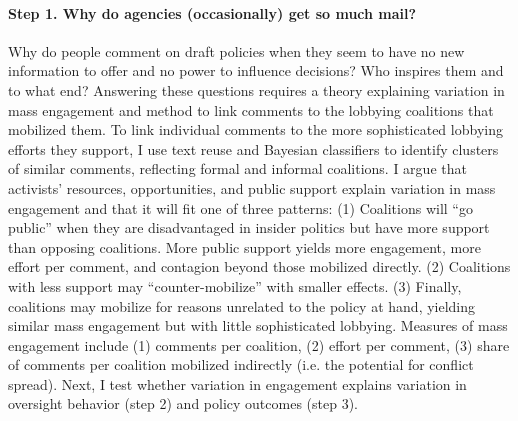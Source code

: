 \paragraph{Step 1. Why do agencies (occasionally) get so much mail?} %
Why do people comment on draft policies when they seem to have no new information to offer and no power to influence decisions? Who inspires them and to what end? 
Answering these questions requires a theory explaining variation in mass engagement and method to link comments to the lobbying coalitions that mobilized them.  
To link individual comments to the more sophisticated lobbying efforts they support, I use text reuse and Bayesian classifiers to identify clusters of similar comments, reflecting formal and informal coalitions.
I argue that activists' resources, opportunities, and public support explain variation in mass engagement %
and that it will fit one of three patterns:
(1) Coalitions will ``go public'' when they are disadvantaged in insider politics but have more support than opposing coalitions. More public support yields more engagement, more effort per comment, and contagion beyond those mobilized directly. (2) Coalitions with less support may ``counter-mobilize'' with smaller effects. (3) Finally, coalitions may mobilize for reasons unrelated to the policy at hand, yielding similar mass engagement but with little sophisticated lobbying. 
Measures of mass engagement include 
(1) comments per coalition, %
(2) effort per comment, %
(3) share of comments per coalition mobilized indirectly (i.e. the potential for conflict spread).
Next, I test whether variation in engagement explains variation in oversight behavior (step 2) and policy outcomes (step 3).

